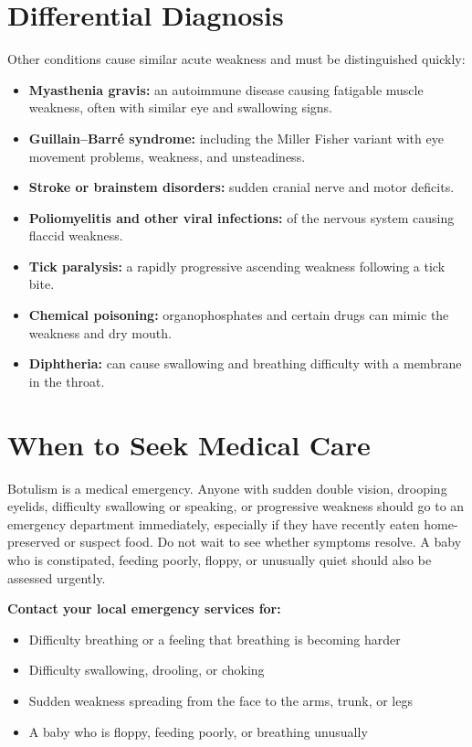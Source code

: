 \section*{Differential Diagnosis}
Other conditions cause similar acute weakness and must be distinguished quickly:
\begin{itemize}
    \item \textbf{Myasthenia gravis:} an autoimmune disease causing fatigable muscle weakness, often with similar eye and swallowing signs.
    \item \textbf{Guillain--Barr\'e syndrome:} including the Miller Fisher variant with eye movement problems, weakness, and unsteadiness.
    \item \textbf{Stroke or brainstem disorders:} sudden cranial nerve and motor deficits.
    \item \textbf{Poliomyelitis and other viral infections:} of the nervous system causing flaccid weakness.
    \item \textbf{Tick paralysis:} a rapidly progressive ascending weakness following a tick bite.
    \item \textbf{Chemical poisoning:} organophosphates and certain drugs can mimic the weakness and dry mouth.
    \item \textbf{Diphtheria:} can cause swallowing and breathing difficulty with a membrane in the throat.
\end{itemize}

\section*{When to Seek Medical Care}
Botulism is a medical emergency. Anyone with sudden double vision, drooping eyelids, difficulty swallowing or speaking, or progressive weakness should go to an emergency department immediately, especially if they have recently eaten home-preserved or suspect food. Do not wait to see whether symptoms resolve. A baby who is constipated, feeding poorly, floppy, or unusually quiet should also be assessed urgently.

\textbf{Contact your local emergency services for:}
\begin{itemize}
    \item Difficulty breathing or a feeling that breathing is becoming harder
    \item Difficulty swallowing, drooling, or choking
    \item Sudden weakness spreading from the face to the arms, trunk, or legs
    \item A baby who is floppy, feeding poorly, or breathing unusually
\end{itemize}


